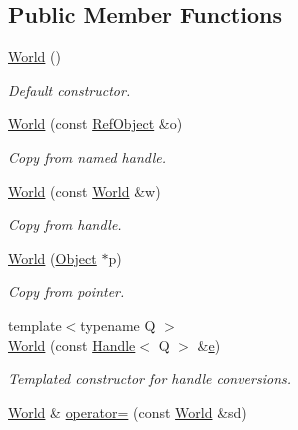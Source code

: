 \subsection*{Public Member Functions}
\begin{DoxyCompactItemize}
\item 
\hyperlink{class_d_d4hep_1_1_geometry_1_1_world_a0de7a5ff6ecdfc4ac5fc3b05585eef32}{World} ()
\begin{DoxyCompactList}\small\item\em Default constructor. \end{DoxyCompactList}\item 
\hyperlink{class_d_d4hep_1_1_geometry_1_1_world_ab51a5950dc7bf892672b90fb6e7c3c1f}{World} (const \hyperlink{class_d_d4hep_1_1_geometry_1_1_world_a796916c7109e45753547adc18d85aa7f}{Ref\+Object} \&o)
\begin{DoxyCompactList}\small\item\em Copy from named handle. \end{DoxyCompactList}\item 
\hyperlink{class_d_d4hep_1_1_geometry_1_1_world_a53f6b4c7c3c0187d5750c275d91b6928}{World} (const \hyperlink{class_d_d4hep_1_1_geometry_1_1_world}{World} \&w)
\begin{DoxyCompactList}\small\item\em Copy from handle. \end{DoxyCompactList}\item 
\hyperlink{class_d_d4hep_1_1_geometry_1_1_world_aaa4f4f1b207ec4a4245047cb48e24681}{World} (\hyperlink{class_d_d4hep_1_1_geometry_1_1_world_ade4542483ec578548cb266880f67e329}{Object} $\ast$p)
\begin{DoxyCompactList}\small\item\em Copy from pointer. \end{DoxyCompactList}\item 
{\footnotesize template$<$typename Q $>$ }\\\hyperlink{class_d_d4hep_1_1_geometry_1_1_world_a5694706fc2a89866e95051a13adf6135}{World} (const \hyperlink{class_d_d4hep_1_1_handle}{Handle}$<$ Q $>$ \&\hyperlink{_volumes_8cpp_a8a9a1f93e9b09afccaec215310e64142}{e})
\begin{DoxyCompactList}\small\item\em Templated constructor for handle conversions. \end{DoxyCompactList}\item 
\hyperlink{class_d_d4hep_1_1_geometry_1_1_world}{World} \& \hyperlink{class_d_d4hep_1_1_geometry_1_1_world_a8bff84a367718e07ad1e34ac48711327}{operator=} (const \hyperlink{class_d_d4hep_1_1_geometry_1_1_world}{World} \&sd)

\end{DoxyCompactItemize}
